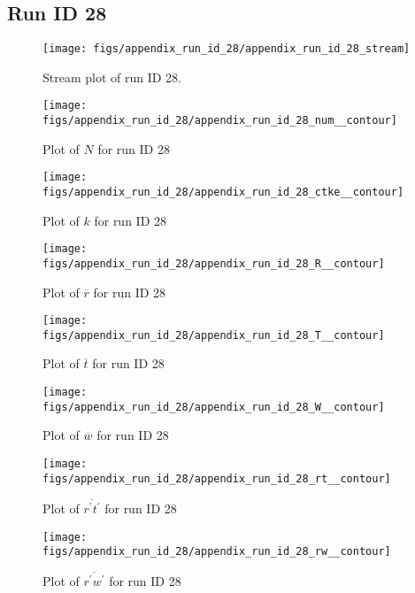 \subsection{Run ID 28}
\begin{figure}[H]
\centering
\texttt{[image: figs/appendix\_run\_id\_28/appendix\_run\_id\_28\_stream]}
\caption{Stream plot of run ID 28.}
\label{fig:appendix_run_id_28_stream}
\end{figure}


\begin{figure}[H]
\centering
\texttt{[image: figs/appendix\_run\_id\_28/appendix\_run\_id\_28\_num\_\_contour]}
\caption{Plot of $N$ for run ID 28}
\label{fig:appendix_run_id_28_num__contour}
\end{figure}


\begin{figure}[H]
\centering
\texttt{[image: figs/appendix\_run\_id\_28/appendix\_run\_id\_28\_ctke\_\_contour]}
\caption{Plot of $k$ for run ID 28}
\label{fig:appendix_run_id_28_ctke__contour}
\end{figure}


\begin{figure}[H]
\centering
\texttt{[image: figs/appendix\_run\_id\_28/appendix\_run\_id\_28\_R\_\_contour]}
\caption{Plot of $\overline{r}$ for run ID 28}
\label{fig:appendix_run_id_28_R__contour}
\end{figure}


\begin{figure}[H]
\centering
\texttt{[image: figs/appendix\_run\_id\_28/appendix\_run\_id\_28\_T\_\_contour]}
\caption{Plot of $\overline{t}$ for run ID 28}
\label{fig:appendix_run_id_28_T__contour}
\end{figure}


\begin{figure}[H]
\centering
\texttt{[image: figs/appendix\_run\_id\_28/appendix\_run\_id\_28\_W\_\_contour]}
\caption{Plot of $\overline{w}$ for run ID 28}
\label{fig:appendix_run_id_28_W__contour}
\end{figure}


\begin{figure}[H]
\centering
\texttt{[image: figs/appendix\_run\_id\_28/appendix\_run\_id\_28\_rt\_\_contour]}
\caption{Plot of $\overline{r^\prime t^\prime}$ for run ID 28}
\label{fig:appendix_run_id_28_rt__contour}
\end{figure}


\begin{figure}[H]
\centering
\texttt{[image: figs/appendix\_run\_id\_28/appendix\_run\_id\_28\_rw\_\_contour]}
\caption{Plot of $\overline{r^\prime w^\prime}$ for run ID 28}
\label{fig:appendix_run_id_28_rw__contour}
\end{figure}


